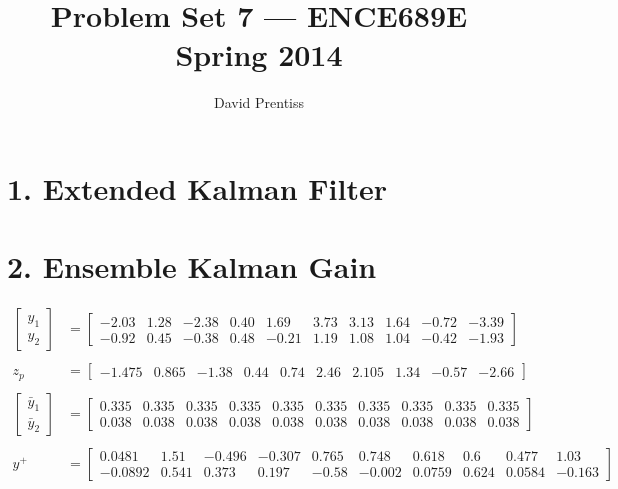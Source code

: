 \documentclass[fleqn, letterpaper]{tufte-handout}
\title{Problem Set 7 --- ENCE689E Spring 2014}
\author{David Prentiss}
\begin{document}
\maketitle

\section{1. Extended Kalman Filter}
\section{2. Ensemble Kalman Gain}
\begin{align*}\begin{bmatrix} y_1 \\ y_2 \end{bmatrix} 
&= \begin{bmatrix} -2.03 & 1.28 & -2.38 & 0.40 & 1.69 & 3.73 & 3.13 & 1.64 & -0.72 & -3.39\\ -0.92 & 0.45 & -0.38 & 0.48 & -0.21 & 1.19 & 1.08 & 1.04 & -0.42 & -1.93 \end{bmatrix} \\\\
z_p 
&= \begin{bmatrix} -1.475 & 0.865 & -1.38 & 0.44 & 0.74 & 2.46 & 2.105 & 1.34 & -0.57 & -2.66 \end{bmatrix} \\\\
\begin{bmatrix} \bar{y}_1 \\ \bar{y}_2 \end{bmatrix} 
&=\begin{bmatrix} 0.335 & 0.335 & 0.335 & 0.335 & 0.335 & 0.335 & 0.335 & 0.335 & 0.335 & 0.335\\ 0.038 & 0.038 & 0.038 & 0.038 & 0.038 & 0.038 & 0.038 & 0.038 & 0.038 & 0.038 \end{bmatrix} \\\\
y^+
&=\begin{bmatrix} 0.0481 & 1.51 & -0.496 & -0.307 & 0.765 & 0.748 & 0.618 & 0.6 & 0.477 & 1.03\\ -0.0892 & 0.541 & 0.373 & 0.197 & -0.58 & -0.002 & 0.0759 & 0.624 & 0.0584 & -0.163 \end{bmatrix}
\end{align*}
\end{document}
